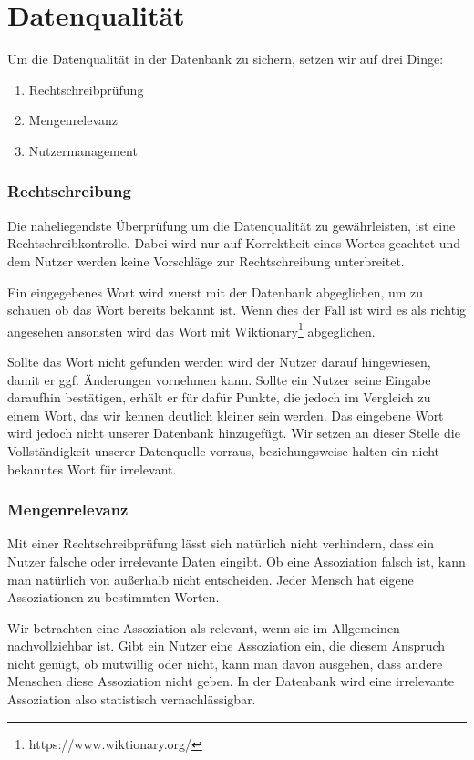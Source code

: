 \section{Datenqualität}
Um die Datenqualität  in der Datenbank zu sichern, setzen wir auf drei Dinge:

\begin{enumerate}
	\item Rechtschreibprüfung
	\item Mengenrelevanz
	\item Nutzermanagement
\end{enumerate}

\subsubsection{Rechtschreibung}
Die naheliegendste Überprüfung um die Datenqualität zu gewährleisten, ist eine
Rechtschreibkontrolle. Dabei wird nur auf Korrektheit eines Wortes geachtet und dem Nutzer werden keine Vorschläge zur Rechtschreibung unterbreitet.

Ein eingegebenes Wort wird zuerst mit der Datenbank abgeglichen, um zu schauen ob das Wort bereits bekannt ist. Wenn dies der Fall ist wird es als richtig angesehen ansonsten wird das Wort mit Wiktionary\footnote{https://www.wiktionary.org/} abgeglichen.

Sollte das Wort nicht gefunden werden wird der Nutzer darauf hingewiesen, damit er ggf. Änderungen vornehmen kann. Sollte ein Nutzer seine Eingabe daraufhin bestätigen, erhält er für dafür Punkte, die jedoch im Vergleich zu einem Wort, das wir kennen deutlich kleiner sein werden. Das eingebene Wort wird jedoch nicht unserer Datenbank hinzugefügt. Wir setzen an dieser Stelle die Vollständigkeit unserer Datenquelle vorraus, beziehungsweise halten ein nicht bekanntes Wort für irrelevant.

\subsubsection{Mengenrelevanz}
Mit einer Rechtschreibprüfung lässt sich natürlich nicht verhindern, dass ein
Nutzer falsche oder irrelevante Daten eingibt. Ob eine Assoziation falsch ist,
kann man natürlich von außerhalb nicht entscheiden. Jeder Mensch hat eigene
Assoziationen zu bestimmten Worten.

Wir betrachten eine Assoziation als relevant, wenn sie im Allgemeinen
nachvollziehbar ist. Gibt ein Nutzer eine Assoziation ein, die diesem
Anspruch nicht genügt, ob mutwillig oder nicht, kann man davon ausgehen, dass
andere Menschen diese Assoziation nicht geben. In der Datenbank wird eine
irrelevante Assoziation also statistisch vernachlässigbar.

